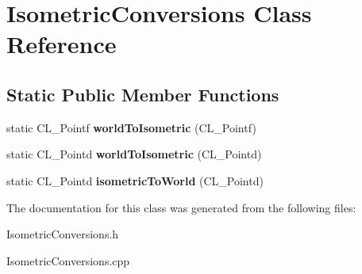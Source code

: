 \hypertarget{classIsometricConversions}{
\section{IsometricConversions Class Reference}
\label{classIsometricConversions}
}
\subsection*{Static Public Member Functions}
\begin{DoxyCompactItemize}
\item 
\hypertarget{classIsometricConversions_a925fb6ecff83501f956092ebd4c237ce}{
static CL\_\-Pointf {\bfseries worldToIsometric} (CL\_\-Pointf)}
\label{classIsometricConversions_a925fb6ecff83501f956092ebd4c237ce}

\item 
\hypertarget{classIsometricConversions_a039c5054ad98fa76218151f39941a3d8}{
static CL\_\-Pointd {\bfseries worldToIsometric} (CL\_\-Pointd)}
\label{classIsometricConversions_a039c5054ad98fa76218151f39941a3d8}

\item 
\hypertarget{classIsometricConversions_a97f4247e5ab8e730432bda5da0be3527}{
static CL\_\-Pointd {\bfseries isometricToWorld} (CL\_\-Pointd)}
\label{classIsometricConversions_a97f4247e5ab8e730432bda5da0be3527}

\end{DoxyCompactItemize}


The documentation for this class was generated from the following files:\begin{DoxyCompactItemize}
\item 
IsometricConversions.h\item 
IsometricConversions.cpp\end{DoxyCompactItemize}
